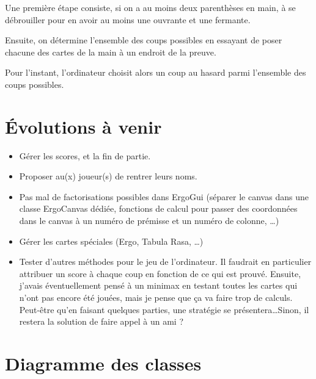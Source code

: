 \documentclass[12pt, algo]{cours}
\begin{document}
Une première étape consiste, si on a au moins deux parenthèses en main, à se débrouiller pour en avoir au moins une ouvrante et une fermante.

Ensuite, on détermine l'ensemble des coups possibles en essayant de poser chacune des cartes de la main à un endroit de la preuve.

Pour l'instant, l'ordinateur choisit alors un coup au hasard parmi l'ensemble des coups possibles.

\section{Évolutions à venir}

\begin{itemize}
\item Gérer les scores, et la fin de partie.
\item Proposer au(x) joueur(s) de rentrer leurs noms.
\item Pas mal de factorisations possibles dans ErgoGui (séparer le canvas dans une classe ErgoCanvas dédiée, fonctions de calcul pour passer des coordonnées dans le canvas à un numéro de prémisse et un numéro de colonne, \dots)
\item Gérer les cartes spéciales (Ergo, Tabula Rasa, \dots)
\item Tester d'autres méthodes pour le jeu de l'ordinateur. Il faudrait en particulier attribuer un score à chaque coup en fonction de ce qui est prouvé. Ensuite, j'avais éventuellement pensé à un minimax en testant toutes les cartes qui n'ont pas encore été jouées, mais je pense que ça va faire trop de calculs. Peut-être qu'en faisant quelques parties, une stratégie se présentera\dots Sinon, il restera la solution de faire appel à un ami ?
\end{itemize}

\appendix

\section{Diagramme des classes}


\end{document}
